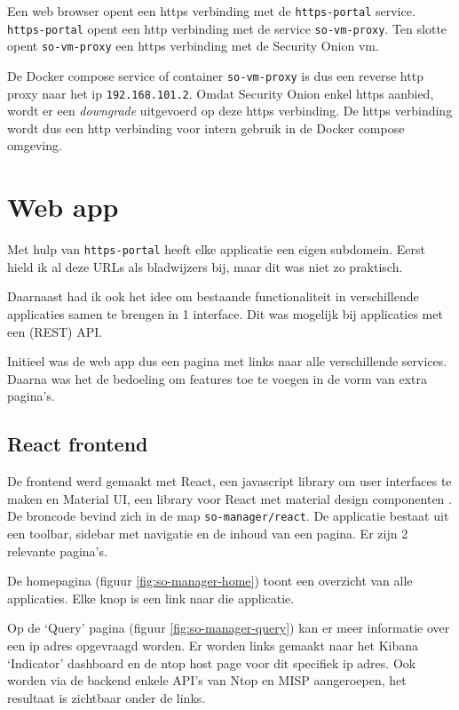 \documentclass[a4paper,12pt]{report}
\begin{document}
Een web browser opent een https verbinding met de \lstinline|https-portal| service.
\lstinline|https-portal| opent een http verbinding met de service \lstinline|so-vm-proxy|.
Ten slotte opent \lstinline|so-vm-proxy| een https verbinding met de Security Onion vm.

De Docker compose service of container \lstinline|so-vm-proxy| is dus een reverse http proxy naar het ip \lstinline|192.168.101.2|.
Omdat Security Onion enkel https aanbied, wordt er een \emph{downgrade} uitgevoerd op deze https verbinding.
De https verbinding wordt dus een http verbinding voor intern gebruik in de Docker compose omgeving.

\section{Web app}
Met hulp van \lstinline|https-portal| heeft elke applicatie een eigen subdomein.
Eerst hield ik al deze URLs als bladwijzers bij, maar dit was niet zo praktisch.

Daarnaast had ik ook het idee om bestaande functionaliteit in verschillende applicaties samen te brengen in 1 interface.
Dit was mogelijk bij applicaties met een (REST) API.

Initieel was de web app dus een pagina met links naar alle verschillende services.
Daarna was het de bedoeling om features toe te voegen in de vorm van extra pagina's.

\subsection{React frontend}
\label{sec:so-manager-frontend}
De frontend werd gemaakt met React, een javascript library om user interfaces te maken \autocite{react:home} en Material UI, een library voor React met material design componenten \autocite{material-ui:home}.
De broncode bevind zich in de map \lstinline|so-manager/react|.
De applicatie bestaat uit een toolbar, sidebar met navigatie en de inhoud van een pagina.
Er zijn 2 relevante pagina's.

De homepagina (figuur \ref{fig:so-manager-home}) toont een overzicht van alle applicaties.
Elke knop is een link naar die applicatie.

Op de `Query' pagina (figuur \ref{fig:so-manager-query}) kan er meer informatie over een ip adres opgevraagd worden.
Er worden links gemaakt naar het Kibana `Indicator' dashboard en de ntop host page voor dit specifiek ip adres.
Ook worden via de backend enkele API's van Ntop en MISP aangeroepen, het resultaat is zichtbaar onder de links.
\end{document}
